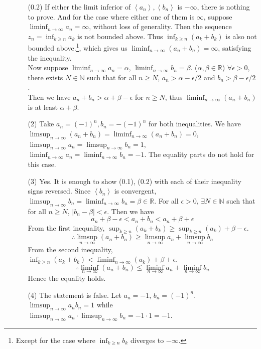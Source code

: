\documentclass[12pt]{report}
\newcommand{\bb}[1]{\mathbb{#1}}
\renewcommand{\span}[1]{\left\langle #1 \right\rangle}
\newcommand{\abs}[1]{\left|#1\right|}
\newcommand{\ds}{\displaystyle}
\begin{document}
\begin{enumerate}
\begin{enumerate}
	(0.2) If either the limit inferior of $\span{a_n}, \span{b_n}$ is $-\infty$, there is nothing to prove. And for the case where either one of them is $\infty$, suppose $\ds\liminf_{n\rightarrow \infty}a_n=\infty$, without loss of generality. Then the sequence $z_n=\inf_{k\geq n}a_k$ is not bounded above. Thus $\inf_{k\geq n}(a_k+b_k)$ is also not bounded above.\footnote{Except for the case where $\inf_{k\geq n}b_k$ diverges to $-\infty$.}, which gives us $\ds \liminf_{n\rightarrow \infty}(a_n+b_n) = \infty$, satisfying the inequality.\\
	Now suppose $\ds\liminf_{n\rightarrow \infty}a_n = \alpha$, $\ds \liminf_{n\rightarrow \infty} b_n = \beta$. ($\alpha, \beta \in \bb{R}$) $\forall \epsilon > 0$, there exists $N\in \bb{N}$ such that for all $n\geq N$, $a_n > \alpha - \epsilon/2$ and $b_n > \beta - \epsilon /2$. \\Then we have $a_n+b_n > \alpha + \beta - \epsilon$ for $n\geq N$, thus $\ds\liminf_{n\rightarrow \infty}(a_n+b_n)$ is at least $\alpha+\beta$.
	\item[(2)] Take $a_n = (-1)^n, b_n = -(-1)^n$ for both inequalities. We have $\ds\limsup_{n\rightarrow \infty}(a_n+b_n) = \liminf_{n\rightarrow \infty}(a_n+b_n)= 0$, $\ds \limsup_{n\rightarrow \infty}a_n = \limsup_{n\rightarrow \infty}b_n = 1$, $\ds \liminf_{n\rightarrow \infty}a_n = \liminf_{n\rightarrow \infty}b_n=-1$. The equality parts do not hold for this case.
	\item[(3)] Yes. It is enough to show (0.1), (0.2) with each of their inequality signs reversed. Since $\span{b_n}$ is convergent, $\limsup_{n\rightarrow \infty} b_n = \liminf_{n\rightarrow \infty} b_n = \beta \in \bb{R}$. For all $ \epsilon > 0 $, $\exists N\in\bb{N}$ such that for all $n\geq N$, $\abs{b_n-\beta} < \epsilon$. Then we have $$a_n+\beta-\epsilon < a_n+b_n < a_n+\beta+\epsilon$$From the first inequality, $\sup_{k\geq n}(a_k+b_k) \geq \sup_{k\geq n}(a_k) + \beta-\epsilon$. $$\therefore \limsup_{n\rightarrow \infty}(a_n+b_n)\geq \limsup_{n\rightarrow \infty}a_n + \limsup_{n\rightarrow \infty}b_n$$
	From the second inequality, $\inf_{k\geq n}(a_k+b_k) < \liminf_{n\rightarrow \infty}(a_k) + \beta+\epsilon$.
	$$\therefore \liminf_{n\rightarrow \infty}(a_n+b_n)\leq \liminf_{n\rightarrow \infty}a_n + \liminf_{n\rightarrow \infty}b_n$$
	Hence the equality holds.
	\item[(4)] The statement is false. Let $a_n = -1$, $b_n = (-1)^n$. $\ds\limsup_{n\rightarrow \infty}a_nb_n = 1$ while $\ds\limsup_{n\rightarrow \infty}a_n \cdot \limsup_{n\rightarrow \infty}b_n = -1 \cdot 1 = -1$.
\end{enumerate}


\end{enumerate}
\end{document}
